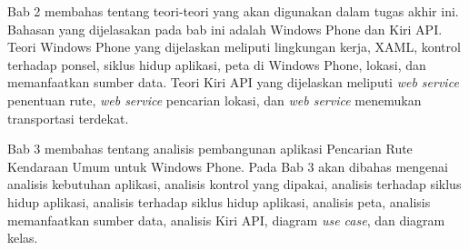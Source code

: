 Bab 2 membahas tentang teori-teori yang akan digunakan dalam tugas akhir ini. Bahasan yang dijelasakan pada bab ini adalah Windows Phone dan Kiri API. Teori Windows Phone yang dijelaskan meliputi lingkungan kerja, XAML, kontrol terhadap ponsel, siklus hidup aplikasi, peta di Windows Phone, lokasi, dan memanfaatkan sumber data. Teori Kiri API yang dijelaskan meliputi \textit{web service} penentuan rute, \textit{web service} pencarian lokasi, dan \textit{web service} menemukan transportasi terdekat. 

Bab 3 membahas tentang analisis pembangunan aplikasi Pencarian Rute Kendaraan Umum untuk Windows Phone. Pada Bab 3 akan dibahas mengenai analisis kebutuhan aplikasi, analisis kontrol yang dipakai, analisis terhadap siklus hidup aplikasi, analisis terhadap siklus hidup aplikasi, analisis peta, analisis memanfaatkan sumber data, analisis Kiri API, diagram \textit{use case}, dan diagram kelas.